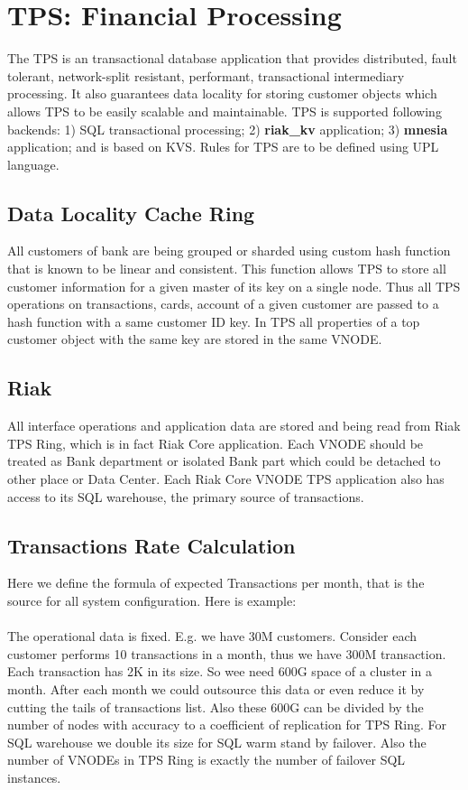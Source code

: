 \section{TPS: Financial Processing}

The TPS is an transactional database application that
provides distributed, fault tolerant, network-split
resistant, performant, transactional intermediary processing.
It also guarantees data locality for storing customer objects which allows
TPS to be easily scalable and maintainable. TPS is supported following backends:
1) SQL transactional processing;
2) {\bf riak\_kv} application;
3) {\bf mnesia} application;
and is based on KVS. Rules for TPS are to be defined using UPL language.

\subsection{Data Locality Cache Ring}

All customers of bank are being grouped or sharded using custom
hash function that is known to be linear and consistent.
This function allows TPS to store all customer information for
a given master of its key on a single node. Thus all TPS operations
on transactions, cards, account of a given customer are passed
to a hash function with a same customer ID key. In TPS all properties of
a top customer object with the same key are stored in the same VNODE.

\subsection{Riak}

All interface operations and application data are stored and
being read from Riak TPS Ring, which is in fact Riak Core application.
Each VNODE should be treated as Bank department or isolated Bank part
which could be detached to other place or Data Center.
Each Riak Core VNODE TPS application also has access to its SQL warehouse,
the primary source of transactions.

\subsection{Transactions Rate Calculation}

Here we define the formula of expected Transactions per month,
that is the source for all system configuration. Here is example:

\paragraph{}
The operational data is fixed. E.g. we have 30M customers.
Consider each customer performs 10 transactions in a month,
thus we have 300M transaction. Each transaction has 2K in its size.
So wee need 600G space of a cluster in a month.
After each month we could outsource this data or even reduce it
by cutting the tails of transactions list. Also these 600G can be divided
by the number of nodes with accuracy to a coefficient of replication for TPS Ring.
For SQL warehouse we double its size for SQL warm stand by failover.
Also the number of VNODEs in TPS Ring is exactly the number of failover SQL instances.


